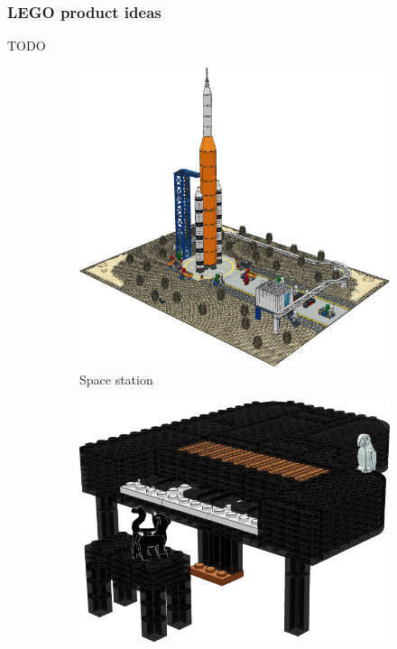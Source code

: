 \documentclass{PDS}
\begin{document}
\subsubsection{LEGO product ideas}
\label{sec:school-lego}

TODO

\begin{figure}[htbp]
    \begin{subfigure}[b]{0.3\textwidth}
        \includegraphics[width=\textwidth]{./figures/space.png}
        \caption{Space station}
        \label{fig:rocket}
    \end{subfigure}
    \hfill
    \begin{subfigure}[b]{0.3\textwidth}
        \includegraphics[width=\textwidth]{./figures/piano.png}

\end{subfigure}
\end{figure}
\end{document}
